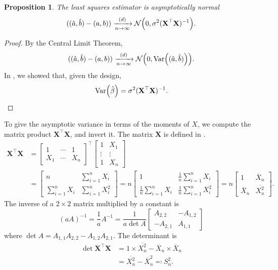 \documentclass[letterpaper, reqno]{amsart}
\newtheorem{prop}{Proposition}[section]
\numberwithin{equation}{section}
\newcommand{\T}{\top} %
\newcommand{\vect}[1]{\boldsymbol{\mathbf{#1}}} %
\newcommand{\Var}[1]{\operatorname{Var}\mleft(#1\mright)}
\newcommand{\N}[2]{\mathcal{N}\mleft( #1, #2 \mright)}
\newcommand{\sumi}[2]{\sum_{#1=1}^{#2}}
\newcommand{\avg}[2]{\frac{1}{#2}\sumi{#1}{#2}}
\newcommand{\Dlim}{\xrightarrow[n \to \infty]{(d)}}
\newcommand{\Xnbar}{\overline{X}_n}
\newcommand{\Xsqbar}{\overline{X_n^2}}
\newcommand{\Xm}{\vect{X}}
\newcommand{\Bvh}{\hat{\beta}}
\begin{document}
\begin{prop}
  The least squares estimator is asymptotically normal
  \[ ((\hat{a}, \hat{b}) - (a, b)) \Dlim \N{0}{\sigma^2 (\Xm^\T\Xm)^{-1}}. \]
\end{prop}

\begin{proof}
  By the Central Limit Theorem,
  \[ ((\hat{a}, \hat{b}) - (a, b)) \Dlim \N{0}{\Var{(\hat{a}, \hat{b})}}. \]
  In , we showed that, given the design,
  \[ \Var{\Bvh} = \sigma^2 (\Xm^\T\Xm)^{-1}. \qedhere \]
\end{proof}

To give the asymptotic variance in terms of the moments of $X$, we compute the
matrix product $\Xm^\T\Xm$, and invert it. The matrix $\Xm$ is defined in
.
{\everymath{\displaystyle}
\begin{align*}
  \Xm^\T \Xm &=
  \begin{bmatrix} 
    1   & \cdots & 1   \\
    X_1 & \cdots & X_n
  \end{bmatrix}^\T
  \begin{bmatrix} 
    1      & X_1    \\
    \vdots & \vdots \\
    1      & X_n
  \end{bmatrix} \\
  &=
  \begin{bmatrix}
    n               & \sumi{i}{n} X_i   \\
    \sumi{i}{n} X_i & \sumi{i}{n} X_i^2
  \end{bmatrix}
  =
  n
  \begin{bmatrix}
    1              & \avg{i}{n} X_i   \\
    \avg{i}{n} X_i & \avg{i}{n} X_i^2
  \end{bmatrix}
  =
  n
  \begin{bmatrix}
    1      & \Xnbar   \\
    \Xnbar & \Xsqbar
  \end{bmatrix}.
\end{align*}
}
The inverse of a $2 \times 2$ matrix multiplied by a constant is
\[ (a A)^{-1} = \frac{1}{a} A^{-1} = \frac{1}{a \det A} 
  \begin{bmatrix}
     A_{2,2} & -A_{1,2} \\
    -A_{2,1} &  A_{1,1}
  \end{bmatrix} 
\]
where $\det A = A_{1,1}A_{2,2} - A_{1,2}A_{2,1}$.
The determinant is
\begin{align*}
  \det \Xm^\T \Xm &= 1 \times \Xsqbar - \Xnbar \times \Xnbar \\
  &= \Xsqbar - \Xnbar^2 \eqqcolon S_n^2.
\end{align*}
\end{document}
